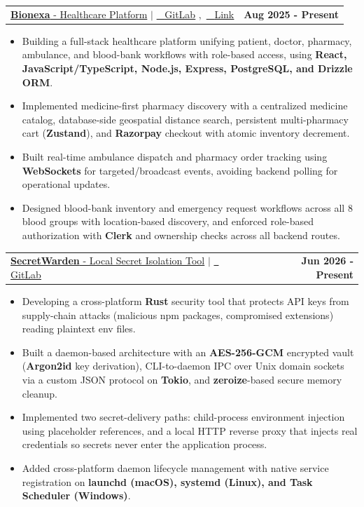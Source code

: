 \documentclass[a4paper,11pt]{article}
\makeatletter
\newcommand{\resumeItem}[1]{
    \item\small{
            {#1 \vspace{-2pt}}
        }
    }
\newcommand{\resumeProjectHeading}[2]{
    \item
        \begin{tabular*}{1.001\textwidth}{l@{\extracolsep{\fill}}r}
            \small#1 & \textbf{\small #2}\\
        \end{tabular*}\vspace{-7pt}
    }
\newcommand{\resumeItemListStart}{\begin{itemize}}
\newcommand{\resumeItemListEnd}{\end{itemize}\vspace{-5pt}}
\makeatother
\begin{document}
\resumeProjectHeading
{
    \large{\underline{\textbf{Bionexa} - Healthcare Platform}}
    $|$
    \href{https://gitlab.com/legion2004/bionexa}
    {\raisebox{-0.2\height}\ \color{blue} \underline{GitLab}}
    $,$
    \href{https://bionexa.milinda.me}
    {\raisebox{-0.2\height}\ \color{blue} \underline{Link}}
}{Aug 2025 - Present}
\resumeItemListStart
\resumeItem{\normalsize{Building a full-stack healthcare platform unifying patient, doctor, pharmacy, ambulance, and blood-bank workflows with role-based access, using \textbf{React, JavaScript/TypeScript, Node.js, Express, PostgreSQL, and Drizzle ORM}.}}
\resumeItem{\normalsize{Implemented medicine-first pharmacy discovery with a centralized medicine catalog, database-side geospatial distance search, persistent multi-pharmacy cart (\textbf{Zustand}), and \textbf{Razorpay} checkout with atomic inventory decrement.}}
\resumeItem{\normalsize{Built real-time ambulance dispatch and pharmacy order tracking using \textbf{WebSockets} for targeted/broadcast events, avoiding backend polling for operational updates.}}
\resumeItem{\normalsize{Designed blood-bank inventory and emergency request workflows across all 8 blood groups with location-based discovery, and enforced role-based authorization with \textbf{Clerk} and ownership checks across all backend routes.}}
\resumeItemListEnd
\vspace{-15pt}

\resumeProjectHeading
{
    \large{\underline{\textbf{SecretWarden} - Local Secret Isolation Tool}}
    $|$
    \href{https://gitlab.com/legion2004/secretwarden}
    {\raisebox{-0.2\height}\ \color{blue} \underline{GitLab}}
}{Jun 2026 - Present}
\resumeItemListStart
\resumeItem{\normalsize{Developing a cross-platform \textbf{Rust} security tool that protects API keys from supply-chain attacks (malicious npm packages, compromised extensions) reading plaintext env files.}}
\resumeItem{\normalsize{Built a daemon-based architecture with an \textbf{AES-256-GCM} encrypted vault (\textbf{Argon2id} key derivation), CLI-to-daemon IPC over Unix domain sockets via a custom JSON protocol on \textbf{Tokio}, and \textbf{zeroize}-based secure memory cleanup.}}
\resumeItem{\normalsize{Implemented two secret-delivery paths: child-process environment injection using placeholder references, and a local HTTP reverse proxy that injects real credentials so secrets never enter the application process.}}
\resumeItem{\normalsize{Added cross-platform daemon lifecycle management with native service registration on \textbf{launchd (macOS), systemd (Linux), and Task Scheduler (Windows)}.}}
\resumeItemListEnd
\vspace{-15pt}
\end{document}
